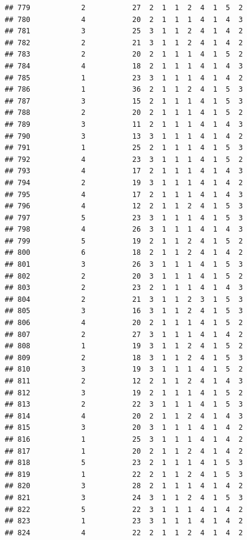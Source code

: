 \documentclass[12pt,]{krantz}
\theoremstyle{definition}
\theoremstyle{definition}
\theoremstyle{remark}
\begin{document}
\begin{verbatim}
## 779            2           27  2  1  1  2  4  1  5  2
## 780            4           20  2  1  1  1  4  1  4  3
## 781            3           25  3  1  1  2  4  1  4  2
## 782            2           21  3  1  1  2  4  1  4  2
## 783            2           20  2  1  1  1  4  1  5  2
## 784            4           18  2  1  1  1  4  1  4  3
## 785            1           23  3  1  1  1  4  1  4  2
## 786            1           36  2  1  1  2  4  1  5  3
## 787            3           15  2  1  1  1  4  1  5  3
## 788            2           20  2  1  1  1  4  1  5  2
## 789            3           11  2  1  1  1  4  1  4  3
## 790            3           13  3  1  1  1  4  1  4  2
## 791            1           25  2  1  1  1  4  1  5  3
## 792            4           23  3  1  1  1  4  1  5  2
## 793            4           17  2  1  1  1  4  1  4  3
## 794            2           19  3  1  1  1  4  1  4  2
## 795            4           17  2  1  1  1  4  1  4  3
## 796            4           12  2  1  1  2  4  1  5  3
## 797            5           23  3  1  1  1  4  1  5  3
## 798            4           26  3  1  1  1  4  1  4  3
## 799            5           19  2  1  1  2  4  1  5  2
## 800            6           18  2  1  1  2  4  1  4  2
## 801            3           26  3  1  1  1  4  1  5  3
## 802            2           20  3  1  1  1  4  1  5  2
## 803            2           23  2  1  1  1  4  1  4  3
## 804            2           21  3  1  1  2  3  1  5  3
## 805            3           16  3  1  1  2  4  1  5  3
## 806            4           20  2  1  1  1  4  1  5  2
## 807            2           27  3  1  1  1  4  1  4  2
## 808            1           19  3  1  1  2  4  1  5  2
## 809            2           18  3  1  1  2  4  1  5  3
## 810            3           19  3  1  1  1  4  1  5  2
## 811            2           12  2  1  1  2  4  1  4  3
## 812            3           19  2  1  1  1  4  1  5  2
## 813            2           22  3  1  1  1  4  1  5  3
## 814            4           20  2  1  1  2  4  1  4  3
## 815            3           20  3  1  1  1  4  1  4  2
## 816            1           25  3  1  1  1  4  1  4  2
## 817            1           20  2  1  1  2  4  1  4  2
## 818            5           23  2  1  1  1  4  1  5  3
## 819            1           22  2  1  1  2  4  1  5  3
## 820            3           28  2  1  1  1  4  1  4  2
## 821            3           24  3  1  1  2  4  1  5  3
## 822            5           22  3  1  1  1  4  1  4  2
## 823            1           23  3  1  1  1  4  1  4  2
## 824            4           22  2  1  1  2  4  1  4  2

\end{verbatim}
\end{document}
